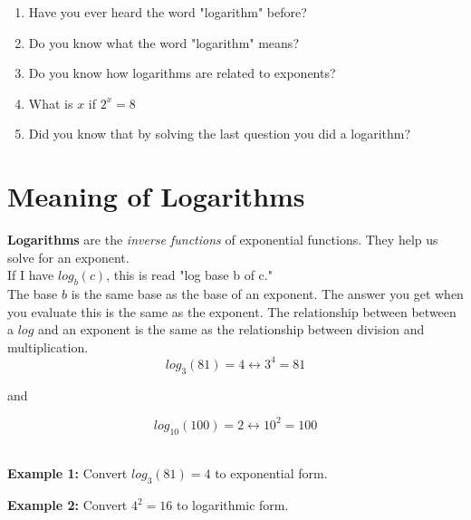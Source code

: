 \documentclass[12pt]{article}
\begin{document}
\begin{enumerate}
	\item Have you ever heard the word "logarithm" before?\\
	
	\item Do you know what the word "logarithm" means?\\
	
	\item Do you know how logarithms are related to exponents?\\
	
	\item What is $x$ if $2^{x}=8$\\

	\item Did you know that by solving the last question you did a logarithm?\\

\end{enumerate}




\section{Meaning of Logarithms}

\textbf{Logarithms} are the \textit{inverse functions} of exponential functions. They help us solve for an exponent.\\

If I have $log_{b}(c)$, this is read "log base b of c."\\

The base $b$ is the same base as the base of an exponent. The answer you get when you evaluate this is the same as the exponent. The relationship between between a $log$ and an exponent is the same as the relationship between division and multiplication.\\

$$log_{3}(81)=4 \longleftrightarrow 3^4=81$$

and

$$log_{10}(100)=2 \longleftrightarrow 10^2=100$$\\

\hrulefill

\textbf{Example 1:} Convert $log_{3}(81)=4$ to exponential form.\\

\vspace{1cm}

\textbf{Example 2:} Convert $4^2=16$ to logarithmic form.\\
\end{document}
